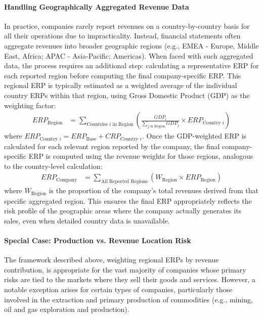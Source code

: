 \paragraph{Handling Geographically Aggregated Revenue Data} \label{par:geo_aggregation}
In practice, companies rarely report revenues on a country-by-country basis for all their operations due to impracticality. Instead, financial statements often aggregate revenues into broader geographic regions (e.g., EMEA - Europe, Middle East, Africa; APAC - Asia-Pacific; Americas).
When faced with such aggregated data, the process requires an additional step: calculating a representative ERP for each reported region before computing the final company-specific ERP. This regional ERP is typically estimated as a weighted average of the individual country ERPs within that region, using Gross Domestic Product (GDP) as the weighting factor:
\begin{align*}
    ERP_{\text{Region}} & = \sum_{\text{Countries } i \text{ in Region}} \left( \frac{GDP_i}{\sum_{j \text{ in Region}} GDP_j} \times ERP_{\text{Country } i} \right)
\end{align*}
where \(ERP_{\text{Country } i} = ERP_{\text{Base}} + CRP_{\text{Country } i}\).
Once the GDP-weighted ERP is calculated for each relevant region reported by the company, the final company-specific ERP is computed using the revenue weights for those regions, analogous to the country-level calculation:
\begin{align*}
    ERP_{\text{Company}} & = \sum_{\text{All Reported Regions}} \left( W_{\text{Region}} \times ERP_{\text{Region}} \right)
\end{align*}
where \(W_{\text{Region}}\) is the proportion of the company's total revenues derived from that specific aggregated region. This ensures the final ERP appropriately reflects the risk profile of the geographic areas where the company actually generates its sales, even when detailed country data is unavailable.

\paragraph{Special Case: Production vs. Revenue Location Risk} \label{par:production_location}
The framework described above, weighting regional ERPs by revenue contribution, is appropriate for the vast majority of companies whose primary risks are tied to the markets where they sell their goods and services. However, a notable exception arises for certain types of companies, particularly those involved in the extraction and primary production of commodities (e.g., mining, oil and gas exploration and production).

